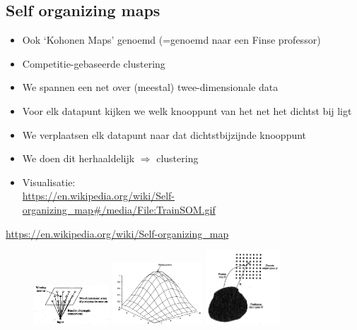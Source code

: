 \documentclass{article}
\begin{document}
\subsection{Self organizing maps}

\begin{itemize}
    \item Ook `Kohonen Maps' genoemd (=genoemd naar een Finse professor)
    \item Competitie-gebaseerde clustering
    \item We spannen een net over (meestal) twee-dimensionale data
    \item Voor elk datapunt kijken we welk knooppunt van het net het dichtst bij ligt
    \item We verplaatsen elk datapunt naar dat dichtstbijzijnde knooppunt 
    \item We doen dit herhaaldelijk $\Rightarrow$ clustering
    \item Visualisatie: \\ \url{https://en.wikipedia.org/wiki/Self-organizing_map#/media/File:TrainSOM.gif}
\end{itemize}

\url{https://en.wikipedia.org/wiki/Self-organizing_map}

\begin{figure}[H]
    \centering
    \includegraphics[width=0.25\textwidth]{self-organizing-maps.png}
    \includegraphics[width=0.3\textwidth]{self-organizing-maps2.png}
    \includegraphics[width=0.25\textwidth]{self-organizing-maps3.png}
    \caption{}
\end{figure}
\end{document}
